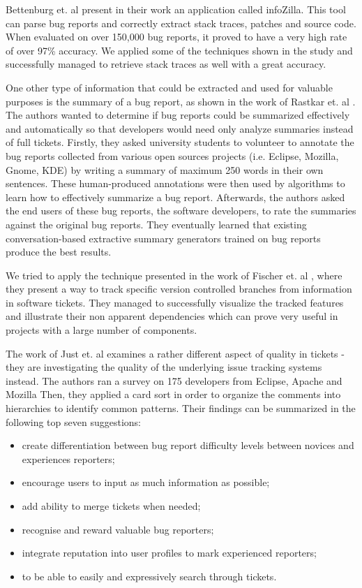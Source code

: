 \documentclass{mpaper}
\begin{document}
Bettenburg et. al \cite{bettenburg2012using} present in their work an application
called infoZilla. This tool can
parse bug reports and correctly extract stack traces, patches and source code. 
When evaluated on over 150,000 bug reports, it proved to have a very high rate of over 97\% accuracy.
We applied some of the techniques shown in the study and successfully managed to 
retrieve stack traces as well with a great accuracy.

One other type of information that could be extracted and used for valuable
purposes is the summary of a bug report, as shown in the work of 
Rastkar et. al \cite{rastkar2010summarizing}. The authors wanted to determine if bug reports
could be summarized effectively and automatically so that developers would
need only analyze summaries instead of full tickets. Firstly, they asked
university students to volunteer to annotate the bug reports collected from
various open sources projects (i.e. Eclipse, Mozilla, Gnome, KDE) by writing
a summary of maximum 250 words in their own sentences. These human-produced 
annotations were then used by algorithms to learn how to effectively summarize a 
bug report.  Afterwards, the authors asked the end users of these bug reports, the 
software developers, to rate the summaries against the original bug reports.
They eventually learned that existing conversation-based extractive summary
generators trained on bug reports produce the best results.

We tried to apply the technique presented in the work of Fischer et. al \cite{fischer2003analyzing},
where they present a way to track specific version controlled branches from information
in software tickets.  They managed to successfully visualize the tracked features and illustrate 
their non apparent dependencies which can prove very useful in projects with a large number of
components. 

The work of Just et. al \cite{just2008towards} examines a rather different aspect
of quality in tickets - they are investigating the quality of the underlying issue 
tracking systems instead. 
The authors ran a survey on 175 developers from Eclipse, Apache and Mozilla
Then, they applied a card sort in order to organize the comments into hierarchies to 
identify common patterns. Their findings can be summarized in the following top seven
suggestions:
  \begin{itemize}
    \item create differentiation between bug report difficulty levels between 
    novices and experiences reporters;
    \item encourage users to input as much information as possible;
    \item add ability to merge tickets when needed;
    \item recognise and reward valuable bug reporters;
    \item integrate reputation into user profiles to mark experienced reporters;
    \item to be able to easily and expressively search through tickets.
  \end{itemize}
\end{document}
